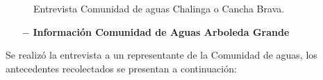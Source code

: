 \documentclass[]{article}
\begin{document}
\begin{figure} [H]
	\caption{Entrevista Comunidad de aguas Chalinga o Cancha Brava.}
\end{figure}
\clearpage
\begin{itemize}
	\item[$-$] \textbf{Información Comunidad de Aguas Arboleda Grande}
\end{itemize}

Se realizó la entrevista a un representante de la Comunidad de aguas, los antecedentes recolectados se presentan a continuación:
\end{document}
